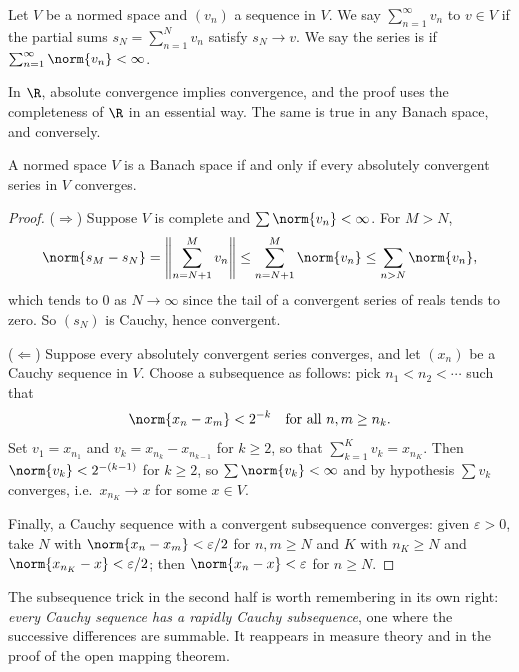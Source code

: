 \begin{definition}
	Let $V$ be a normed space and $(v_n)$ a sequence in $V$. We say $\sum_{n=1}^\infty v_n$  to $v \in V$ if the partial sums $s_N = \sum_{n=1}^N v_n$ satisfy $s_N \to v$. We say the series is  if $\sum_{n=1}^\infty \norm{v_n} < \infty$.
\end{definition}

In $\R$, absolute convergence implies convergence, and the proof uses the completeness of $\R$ in an essential way. The same is true in any Banach space, and conversely.

\begin{theorem}
	A normed space $V$ is a Banach space if and only if every absolutely convergent series in $V$ converges.
\end{theorem}

\begin{proof}
	($\Rightarrow$) Suppose $V$ is complete and $\sum \norm{v_n} < \infty$. For $M > N$,
	$$\norm{s_M - s_N} = \left\| \sum_{n=N+1}^M v_n \right\| \leq \sum_{n=N+1}^M \norm{v_n} \leq \sum_{n > N} \norm{v_n},$$
	which tends to $0$ as $N \to \infty$ since the tail of a convergent series of reals tends to zero. So $(s_N)$ is Cauchy, hence convergent.

	($\Leftarrow$) Suppose every absolutely convergent series converges, and let $(x_n)$ be a Cauchy sequence in $V$. Choose a subsequence as follows: pick $n_1 < n_2 < \cdots$ such that
	$$\norm{x_n - x_m} < 2^{-k} \quad \text{for all } n, m \geq n_k.$$
	Set $v_1 = x_{n_1}$ and $v_k = x_{n_k} - x_{n_{k-1}}$ for $k \geq 2$, so that $\sum_{k=1}^K v_k = x_{n_K}$. Then $\norm{v_k} < 2^{-(k-1)}$ for $k \geq 2$, so $\sum \norm{v_k} < \infty$ and by hypothesis $\sum v_k$ converges, i.e.\ $x_{n_K} \to x$ for some $x \in V$.

	Finally, a Cauchy sequence with a convergent subsequence converges: given $\varepsilon > 0$, take $N$ with $\norm{x_n - x_m} < \varepsilon/2$ for $n,m \geq N$ and $K$ with $n_K \geq N$ and $\norm{x_{n_K} - x} < \varepsilon/2$; then $\norm{x_n - x} < \varepsilon$ for $n \geq N$.
\end{proof}

\begin{remark}
	The subsequence trick in the second half is worth remembering in its own right: \emph{every Cauchy sequence has a rapidly Cauchy subsequence}, one where the successive differences are summable. It reappears in measure theory and in the proof of the open mapping theorem.
\end{remark}

